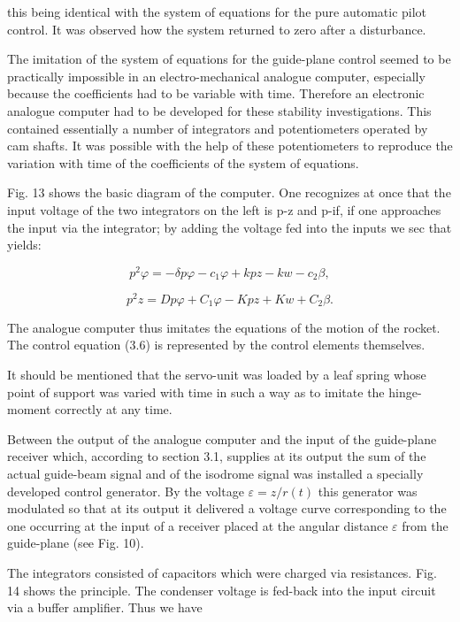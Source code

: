 \documentclass[12pt, a4paper]{article}
\begin{document}
this being identical with the system of equations for the pure automatic pilot control. It was observed how the system returned to zero after a disturbance.

The imitation of the system of equations for the guide-plane control seemed to be practically impossible in an electro-mechanical analogue computer, especially because the coefficients had to be variable with time. Therefore an electronic analogue computer had to be developed for these stability investigations. This contained essentially a number of integrators and potentiometers operated by cam shafts. It was possible with the help of these potentiometers to reproduce the variation with time of the coefficients of the system of equations.

Fig. 13 shows the basic diagram of the computer. One recognizes at once that the input voltage of the two integrators on the left is p-z and p-if, if one approaches the input via the integrator; by adding the voltage fed into the inputs we sec that yields:

\begin{equation}
  p^{2}\varphi=-\delta p\varphi-c_{1}\varphi+kpz-kw-c_{2}\beta,
\end{equation}

\begin{equation}
  p^{2}z=Dp\varphi+C_{1}\varphi-Kpz+Kw+C_{2}\beta.
\end{equation}

The analogue computer thus imitates the equations of the motion of the rocket. The control equation (3.6) is represented by the control elements themselves.

It should be mentioned that the servo-unit was loaded by a leaf spring whose point of support was varied with time in such a way as to imitate the hinge-moment correctly at any time.

Between the output of the analogue computer and the input of the guide-plane receiver which, according to section 3.1, supplies at its output the sum of the actual guide-beam signal and of the isodrome signal was installed a specially developed control generator. By the voltage $\varepsilon=z/r(t)$ this generator was modulated so that at its output it delivered a voltage curve corresponding to the one occurring at the input of a receiver placed at the angular distance $\varepsilon$ from the guide-plane (see Fig. 10).

The integrators consisted of capacitors which were charged via resistances. Fig. 14 shows the principle. The condenser voltage is fed-back into the input circuit via a buffer amplifier. Thus we have
\end{document}
